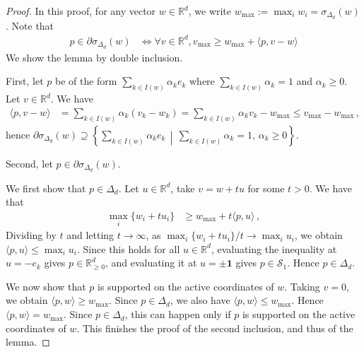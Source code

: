 \documentclass[10pt,a4paper]{amsart}
\newcommand{\R}{\mathbb{R}}
\renewcommand{\geq}{\geqslant}
\renewcommand{\leq}{\leqslant}
\begin{document}
\begin{proof}
	In this proof, for any vector $w \in \R^d$, we write $w_{\max} := \max_i w_i = \sigma_{\Delta_d}(w)$. Note that
	\begin{align*}
		p \in \partial \sigma_{\Delta_d}(w) &\iff \forall v \in \R^d, v_{\max} \geq w_{\max} + \langle p, v - w\rangle
	\end{align*}
	We show the lemma by double inclusion.

	First, let $p$ be of the form $\sum_{k \in I(w)} \alpha_k e_k$ where $\sum_{k \in I(w)} \alpha_k = 1$ and $\alpha_k \geq 0$. Let $v \in \R^d$. We have
	\begin{align*}
	\langle p, v - w\rangle &= \sum_{k \in I(w)} \alpha_k (v_k - w_k) = \sum_{k \in I(w)} \alpha_k v_k - w_{\max} \leq v_{\max} - w_{\max}\,,
	\end{align*}
	hence $\partial \sigma_{\Delta_d}(w) \supseteq \left\{ \sum_{k \in I(w)} \alpha_k e_k \,\middle|\, \sum_{k \in I(w)} \alpha_k = 1,\, \alpha_k \geq 0 \right\} $.

	Second, let $p \in \partial \sigma_{\Delta_d}(w)$.
	
	We first show that $p \in \Delta_d$. Let $u \in \R^d$, take $v = w + t u$ for some $t > 0$. We have that 
	\begin{align*}
	\max_{i} \{w_i + t u_i\} &\geq w_{\max} + t\langle p, u\rangle \, ,
	\end{align*}
	Dividing by $t$ and letting $t \to \infty$, as $\max_{i} \{w_i + t u_i\} / t \to \max_i u_i$, we obtain $\langle p, u\rangle \leq \max_i u_i$. Since this holds for all $u \in \R^d$, evaluating the inequality at $u = -e_k$ gives $p \in \R_{\geq 0}^d$, and evaluating it at $u = \pm \mathbf{1}$ gives $p \in \mathcal{S}_1$. Hence $p \in \Delta_d$.

	We now show that $p$ is supported on the active coordinates of $w$. Taking $v = 0$, we obtain $\langle p, w\rangle \geq w_{\max}$. Since $p \in \Delta_d$, we also have $\langle p, w\rangle \leq w_{\max}$. Hence $\langle p, w\rangle = w_{\max}$. Since $p \in \Delta_d$, this can happen only if $p$ is supported on the active coordinates of $w$. This finishes the proof of the second inclusion, and thus of the lemma.
\end{proof}
\end{document}
